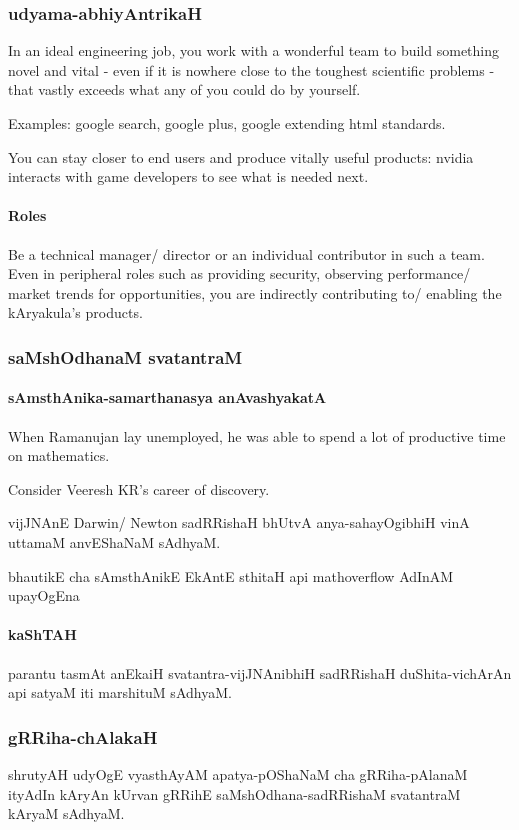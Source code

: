 \documentclass[oneside, article]{memoir}
\begin{document}
\subsubsection{udyama-abhiyAntrikaH}
In an ideal engineering job, you work with a wonderful team to build something novel and vital - even if it is nowhere close to the toughest scientific problems - that vastly exceeds what any of you could do by yourself.

Examples: google search, google plus, google extending html standards.

You can stay closer to end users and produce vitally useful products: nvidia interacts with game developers to see what is needed next.

\paragraph{Roles}
Be a technical manager/ director or an individual contributor in such a team. Even in peripheral roles such as providing security, observing performance/ market trends for opportunities, you are indirectly contributing to/ enabling the kAryakula's products.

\subsubsection{saMshOdhanaM svatantraM}
\paragraph{sAmsthAnika-samarthanasya anAvashyakatA}
\subitem When Ramanujan lay unemployed, he was able to spend a lot of productive time on mathematics.

\subitem Consider Veeresh KR's career of discovery.

vijJNAnE Darwin/ Newton sadRRishaH bhUtvA anya-sahayOgibhiH vinA uttamaM anvEShaNaM sAdhyaM.

bhautikE cha sAmsthAnikE EkAntE sthitaH api mathoverflow AdInAM upayOgEna

\paragraph{kaShTAH}
parantu tasmAt anEkaiH svatantra-vijJNAnibhiH sadRRishaH duShita-vichArAn api satyaM iti marshituM sAdhyaM.

\subsubsection{gRRiha-chAlakaH}
shrutyAH udyOgE vyasthAyAM apatya-pOShaNaM cha gRRiha-pAlanaM ityAdIn kAryAn kUrvan gRRihE saMshOdhana-sadRRishaM svatantraM kAryaM sAdhyaM.
\end{document}

